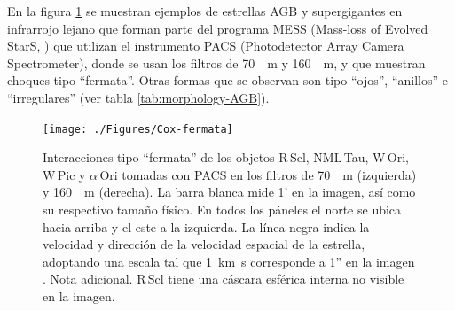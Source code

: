En la figura  \ref{fig:fermata} se muestran ejemplos de estrellas AGB y supergigantes en infrarrojo lejano que forman parte del programa MESS (Mass-loss of Evolved StarS, \citet{Groenewegen:2011}) que utilizan el instrumento PACS (Photodetector Array Camera Spectrometer), donde se usan los filtros de \SI{70}{\mu.m} y \SI{160}{\mu.m}, y que muestran choques tipo ``fermata''. Otras formas que se observan son tipo ``ojos'', ``anillos'' e ``irregulares'' (ver tabla \ref{tab:morphology-AGB}).

\begin{figure}
  \centering
  \texttt{[image: ./Figures/Cox-fermata]}
  \caption[Interacciones tipo ``fermata'' de los objetos R\,Scl, NML\,Tau, W\,Ori, W\,Pic y $\alpha$\,Ori]{Interacciones tipo ``fermata'' de los objetos R\,Scl, NML\,Tau, W\,Ori, W\,Pic y $\alpha$\,Ori tomadas con PACS en los filtros de \SI{70}{\mu.m} (izquierda) y \SI{160}{\mu.m} (derecha). La barra blanca mide 1' en la imagen, así como su respectivo tamaño físico. En todos los páneles el norte se ubica hacia arriba y el este a la izquierda. La línea negra indica la velocidad y dirección de la velocidad espacial de la estrella, adoptando una escala tal que \SI{1}{km.s} corresponde a 1'' en la imagen \citep{Cox:2012}. Nota adicional. R\,Scl tiene una cáscara esférica interna no visible en la imagen.}
  \label{fig:fermata}
\end{figure}

